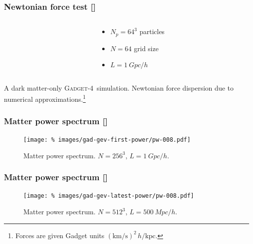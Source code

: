 \documentclass{beamer}
\makeatletter
\newcommand{\mylabel}{%
   [\beamer@againname]}
\newcommand{\gadget}{\textsc{Gadget-4}}
\makeatother
\begin{document}
\begin{frame}[label=forcetest2]
    \frametitle{Newtonian force test\mylabel}
    \vspace*{-.5cm}
    \begin{columns}
        \begin{column}{.65\textwidth}
        \end{column}
        \begin{column}{.35\textwidth}
            \begin{itemize}
               \item $N_p = 64^3$ particles
               \item $N = 64$ grid size
               \item $L = \SI{1}{Gpc}/h$
            \end{itemize}
        \end{column}
    \end{columns}
    \small A dark matter-only \gadget\ simulation. Newtonian force dispersion
    due to numerical approximations.\footnote{Forces are given Gadget units
    $(\text{km/s})^2\, h/\text{kpc}$.}
\end{frame}

\begin{frame}[label=matterpower]
    \frametitle{Matter power spectrum\mylabel}
    \vspace*{-.5cm}
    \begin{figure}
    \centering\texttt{[image: \%
        images/gad-gev-first-power/pw-008.pdf]}%
        \caption{Matter power spectrum. $N=256^3$, $L=\SI{1}{Gpc}/h$.}
    \end{figure}
\end{frame}

\begin{frame}[label=matterpower2]
    \frametitle{Matter power spectrum\mylabel}
    \vspace*{-.5cm}
    \begin{figure}
    \centering\texttt{[image: \%
        images/gad-gev-latest-power/pw-008.pdf]}%
        \caption{Matter power spectrum. $N=512^3$, $L=\SI{500}{Mpc}/h$.}
    \end{figure}
\end{frame}
\end{document}
